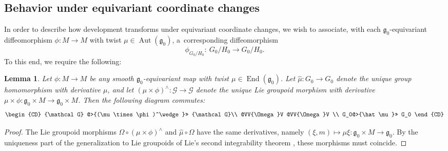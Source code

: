 \documentclass[pdftex]{sigma}
\DeclareMathOperator{\automorphism}{Aut}
\DeclareMathOperator{\selfmorphism}{End}
\numberwithin{equation}{section}
\newtheorem{LemmaBlaom}[TheoremBlaom]{Lemma}
\begin{document}
\subsection{Behavior under equivariant coordinate changes}\label{yut}
In order to describe how development transforms under
equivariant coordinate changes, we wish to associate, with each
${\mathfrak g}_0$-equivariant dif\/feomorphism $\phi \colon M
\rightarrow M$ with twist $\mu \in \automorphism ({\mathfrak g}_0)$, a~corresponding dif\/feomorphism
\[
\phi_{G_0/H_0}\colon \ {G_0/H_0}
\rightarrow {G_0/H_0}.
\]
 To this end, we require the following:

\begin{LemmaBlaom}\label{LemmaA}
  Let $\phi \colon M \rightarrow M$ be any smooth ${\mathfrak
    g}_0$-equivariant map with twist $\mu \in \selfmorphism({\mathfrak
    g}_0)$. Let $\hat\mu \colon G_0 \rightarrow G_0$ denote the unique
  group homomorphism with derivative $\mu$, and let $(\mu \times
  \phi)^\wedge \colon {\mathcal G} \rightarrow {\mathcal G} $ denote
  the unique Lie groupoid morphism with derivative $\mu \times \phi \colon
  {\mathfrak g}_0 \times M \rightarrow {\mathfrak g}_0 \times M$. Then
  the following diagram commutes:
\begin{gather*}
  \begin{CD}
    {\mathcal G}   @>{(\mu \times \phi)^\wedge}>> {\mathcal G}\\
    @VV{\Omega}V @VV{\Omega}V \\
    G_0@>{\hat\mu}>> G_0
  \end{CD}
\end{gather*}
\end{LemmaBlaom}

\begin{proof}
  The Lie groupoid morphisms $\Omega \circ (\mu \times \phi)^\wedge$ and
  $\hat\mu \circ \Omega$ have the same derivatives, namely
  $(\xi,m)\mapsto \mu \xi \colon {\mathfrak g}_0 \times M \rightarrow
  {\mathfrak g}_0 $. By the uniqueness part of the generalization to
  Lie groupoids of Lie's second integrability theorem \cite[Lie~II]{Crainic_Fernandes_11}, these morphisms must coincide.
\end{proof}
\end{document}
